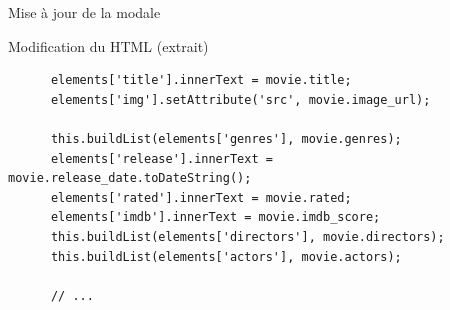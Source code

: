 \begin{frame}[fragile]{Mise à jour de la modale}
  \begin{block}{Modification du HTML (extrait)}
    \tiny
    \begin{verbatim}
      elements['title'].innerText = movie.title;
      elements['img'].setAttribute('src', movie.image_url);
      
      this.buildList(elements['genres'], movie.genres);    
      elements['release'].innerText = movie.release_date.toDateString();
      elements['rated'].innerText = movie.rated;
      elements['imdb'].innerText = movie.imdb_score;
      this.buildList(elements['directors'], movie.directors);
      this.buildList(elements['actors'], movie.actors);

      // ...
    \end{verbatim}
  \end{block}
\end{frame}
